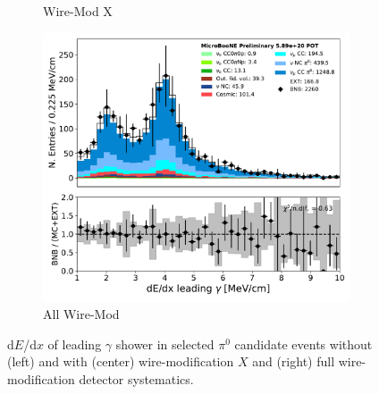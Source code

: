 \documentclass[a4paper]{article}
\newcommand{\dedx}{d$E$/d$x$\xspace}
\begin{document}
\begin{figure}[H]
\begin{center}
\begin{subfigure}[b]{0.3\textwidth}
    \caption{\label{fig:detsys:datamc:dedx:wirex}Wire-Mod X}
    \end{subfigure}
    \begin{subfigure}[b]{0.3\textwidth}
    \centering
    \includegraphics[width=1.00\textwidth]{detsys/datamc/pi0_dedx1_fit_Y_03292020_detsys.pdf}
    \caption{\label{fig:detsys:datamc:dedx:all}All Wire-Mod}
    \end{subfigure}
\caption{\label{fig:detsys:datamc:dedx}\dedx of leading $\gamma$ shower in selected $\pi^0$ candidate events without (left) and with (center) wire-modification $X$ and (right) full wire-modification detector systematics.}
\end{center}
\end{figure}
\end{document}
